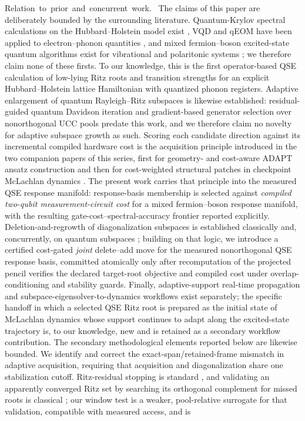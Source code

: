 \documentclass[
  reprint,
  amsmath,
  amssymb,
  aps,
  pra,
  nofootinbib,
  superscriptaddress,
  floatfix
]{revtex4-2}
\newcommand{\tentative}[1]{\textcolor{red!70!black}{#1}}
\newcommand{\structlabel}[1]{\noindent\mbox{\tentative{#1.}}~}
\begin{document}
\structlabel{Relation to prior and concurrent work}
The claims of this paper are deliberately bounded by the surrounding literature.  Quantum-Krylov spectral calculations on the Hubbard--Holstein model exist \cite{Backes2023HHDMFT}, VQD and qEOM have been applied to electron--phonon quantities \cite{ZhouShang2024EPhQC}, and mixed fermion--boson excited-state quantum algorithms exist for vibrational and polaritonic systems \cite{Ollitrault2020qEOM,PavosevicFlick2021QEDEOM}; we therefore claim none of these firsts.  To our knowledge, this is the first operator-based QSE calculation of low-lying Ritz roots and transition strengths for an explicit Hubbard--Holstein lattice Hamiltonian with quantized phonon registers.  Adaptive enlargement of quantum Rayleigh--Ritz subspaces is likewise established: residual-guided quantum Davidson iteration \cite{Tkachenko2024QDavidson} and gradient-based generator selection over nonorthogonal UCC pools \cite{Zheng2024ADAPTGCIM} predate this work, and we therefore claim no novelty for adaptive subspace growth as such.  Scoring each candidate direction against its incremental compiled hardware cost is the acquisition principle introduced in the two companion papers of this series, first for geometry- and cost-aware ADAPT ansatz construction \cite{PaperI} and then for cost-weighted structural patches in checkpoint McLachlan dynamics \cite{PaperII}.  The present work carries that principle into the measured QSE response manifold: response-basis membership is selected against \emph{compiled two-qubit measurement-circuit cost} for a mixed fermion--boson response manifold, with the resulting gate-cost--spectral-accuracy frontier reported explicitly.  Deletion-and-regrowth of diagonalization subspaces is established classically \cite{WuSimon2000ThickRestart,Sorensen1992IRA} and, concurrently, on quantum subspaces \cite{Rammal2026OQKD,Patra2025PIGenSQD,LiuDeng2026CSQSE}; building on that logic, we introduce a certified cost-gated \emph{joint} delete--add move for the measured nonorthogonal QSE response basis, committed atomically only after recomputation of the projected pencil verifies the declared target-root objective and compiled cost under overlap-conditioning and stability guards.  Finally, adaptive-support real-time propagation \cite{Yao2021AVQDS,Gomes2023AVQDSGreen,Mootz2024AdaptiveGreen} and subspace-eigensolver-to-dynamics workflows \cite{Gandon2024NonadiabaticQSE,Sambasivam2026TIMESADAPT,Berthusen2024MRQDDynamics} exist separately; the specific handoff in which a selected QSE Ritz root is prepared as the initial state of McLachlan dynamics whose support continues to adapt along the excited-state trajectory is, to our knowledge, new and is retained as a secondary workflow contribution.  The secondary methodological elements reported below are likewise bounded.  We identify and correct the exact-span/retained-frame mismatch in adaptive acquisition, requiring that acquisition and diagonalization share one stabilization cutoff.  Ritz-residual stopping is standard \cite{Tkachenko2024QDavidson}, and validating an apparently converged Ritz set by searching its orthogonal complement for missed roots is classical \cite{McCombs2006IVE}; our window test is a weaker, pool-relative surrogate for that validation, compatible with measured access, and is 
\end{document}
